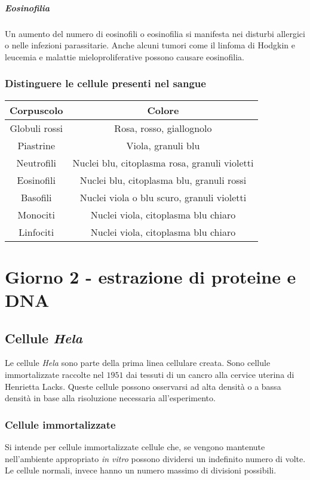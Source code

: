 				\subparagraph{Eosinofilia}
				Un aumento del numero di eosinofili o eosinofilia si manifesta nei disturbi allergici o nelle infezioni parassitarie. 
				Anche alcuni tumori come il linfoma di Hodgkin e leucemia e malattie mieloproliferative possono causare eosinofilia.
		\subsubsection{Distinguere le cellule presenti nel sangue}
		\begin{center}
			\begin{tabular}{|c|c|}
				\hline
				Corpuscolo & Colore \\
				\hline
				Globuli rossi & Rosa, rosso, giallognolo \\
				\hline
				Piastrine & Viola, granuli blu \\
				\hline
				Neutrofili & Nuclei blu, citoplasma rosa, granuli violetti\\
				\hline
				Eosinofili &  Nuclei blu, citoplasma blu, granuli rossi\\
				\hline
				Basofili &  Nuclei viola o blu scuro, granuli violetti\\
				\hline
				Monociti &  Nuclei viola, citoplasma blu chiaro\\
				\hline
				Linfociti &  Nuclei viola, citoplasma blu chiaro\\
				\hline
			\end{tabular}
		\end{center}

\section{Giorno 2 - estrazione di proteine e DNA}
	
	\subsection{Cellule \emph{Hela}}
	Le cellule \emph{Hela} sono parte della prima linea cellulare creata.
	Sono cellule immortalizzate raccolte nel $1951$ dai tessuti di un cancro alla cervice uterina di Henrietta Lacks.
	Queste cellule possono osservarsi ad alta densit\`a o a bassa densit\`a in base alla risoluzione necessaria all'esperimento.
		
		\subsubsection{Cellule immortalizzate}
		Si intende per cellule immortalizzate cellule che, se vengono mantenute nell'ambiente appropriato \emph{in vitro} possono dividersi un indefinito numero di volte.
		Le cellule normali, invece hanno un numero massimo di divisioni possibili.
		
